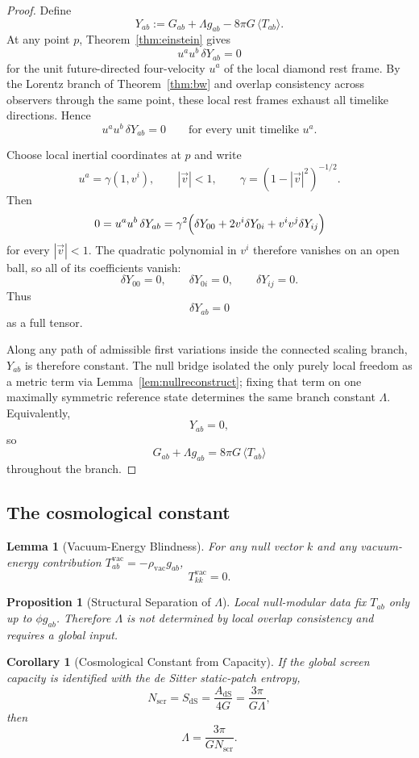 \documentclass[11pt]{article}
\newtheorem{corollary}[theorem]{Corollary}
\newtheorem{proposition}[theorem]{Proposition}
\newtheorem{lemma}[theorem]{Lemma}
\begin{document}
\begin{proof}
Define
\[
Y_{ab}:=G_{ab}+\Lambda g_{ab}-8\pi G\,\langle T_{ab}\rangle.
\]
At any point $p$, Theorem~\ref{thm:einstein} gives
\[
u^a u^b\,\delta Y_{ab}=0
\]
for the unit future-directed four-velocity $u^a$ of the local diamond rest frame. By the Lorentz branch of Theorem~\ref{thm:bw} and overlap consistency across observers through the same point, these local rest frames exhaust all timelike directions. Hence
\[
u^a u^b\,\delta Y_{ab}=0
\qquad
\text{for every unit timelike }u^a.
\]

Choose local inertial coordinates at $p$ and write
\[
u^a=\gamma(1,v^i),
\qquad
|\vec v|<1,
\qquad
\gamma=(1-|\vec v|^2)^{-1/2}.
\]
Then
\[
0=u^a u^b\,\delta Y_{ab}
=
\gamma^2\Bigl(\delta Y_{00}+2v^i\delta Y_{0i}+v^iv^j\delta Y_{ij}\Bigr)
\]
for every $|\vec v|<1$. The quadratic polynomial in $v^i$ therefore vanishes on an open ball, so all of its coefficients vanish:
\[
\delta Y_{00}=0,\qquad
\delta Y_{0i}=0,\qquad
\delta Y_{ij}=0.
\]
Thus
\[
\delta Y_{ab}=0
\]
as a full tensor.

Along any path of admissible first variations inside the connected scaling branch, $Y_{ab}$ is therefore constant. The null bridge isolated the only purely local freedom as a metric term via Lemma~\ref{lem:nullreconstruct}; fixing that term on one maximally symmetric reference state determines the same branch constant $\Lambda$. Equivalently,
\[
Y_{ab}=0,
\]
so
\[
G_{ab}+\Lambda g_{ab}=8\pi G\,\langle T_{ab}\rangle
\]
throughout the branch.
\end{proof}

\subsection{The cosmological constant}

\begin{lemma}[Vacuum-Energy Blindness]\label{lem:vac}
For any null vector $k$ and any vacuum-energy contribution $T^{\mathrm{vac}}_{ab}=-\rho_{\mathrm{vac}}g_{ab}$,
\[
T^{\mathrm{vac}}_{kk}=0.
\]
\end{lemma}

\begin{proposition}[Structural Separation of $\Lambda$]\label{prop:lambda}
Local null-modular data fix $T_{ab}$ only up to $\phi g_{ab}$. Therefore $\Lambda$ is not determined by local overlap consistency and requires a global input.
\end{proposition}

\begin{corollary}[Cosmological Constant from Capacity]\label{cor:lambda}
If the global screen capacity is identified with the de Sitter static-patch entropy,
\[
N_{\mathrm{scr}}=S_{\mathrm{dS}}=\frac{A_{\mathrm{dS}}}{4G}=\frac{3\pi}{G\Lambda},
\]
then
\[
\Lambda=\frac{3\pi}{G N_{\mathrm{scr}}}.
\]
\end{corollary}
\end{document}
